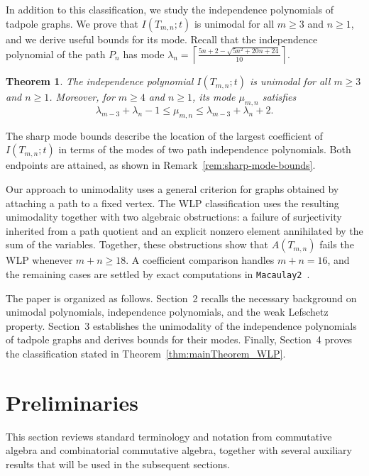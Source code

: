 \documentclass[12pt,twoside]{amsart}
\newtheorem{theorem}[thm]{Theorem}
\theoremstyle{definition}
\theoremstyle{mystyle}
\begin{document}
In addition to this classification, we study the independence polynomials 
of tadpole graphs. We prove that $I(T_{m,n};t)$ is unimodal for all 
$m\geq 3$ and $n\geq 1$, and we derive useful bounds for its mode. 
Recall that the independence polynomial of the path $P_n$ has mode
$\lambda_n=\left\lceil
\frac{5n+2-\sqrt{5n^2+20n+24}}{10}
\right\rceil$.
\begin{theorem}
The independence polynomial $I(T_{m,n};t)$ is unimodal for all $m\geq 3$ 
and $n\geq 1$. Moreover, for $m\geq 4$ and $n\geq 1$, its mode 
$\mu_{m,n}$ satisfies
\begin{equation*}
\lambda_{m-3}+\lambda_n-1
\leq \mu_{m,n}
\leq \lambda_{m-3}+\lambda_n+2.
\end{equation*}
\end{theorem}

The sharp mode bounds describe the location of the largest
coefficient of $I(T_{m,n};t)$ in terms of the modes of two
path independence polynomials. Both endpoints are attained,
as shown in Remark~\ref{rem:sharp-mode-bounds}.

Our approach to unimodality uses a general criterion for
graphs obtained by attaching a path to a fixed vertex.
The WLP classification uses the resulting unimodality
together with two algebraic obstructions: a failure of
surjectivity inherited from a path quotient and an explicit
nonzero element annihilated by the sum of the variables.
Together, these obstructions show that $A(T_{m,n})$ fails
the WLP whenever $m+n\geq18$. A coefficient comparison
handles $m+n=16$, and the remaining cases are settled by
exact computations in \texttt{Macaulay2}~\cite{HPS26M2}.



The paper is organized as follows. Section~2 recalls the necessary 
background on unimodal polynomials, independence polynomials, and the weak 
Lefschetz property. Section~3 establishes the unimodality of the independence 
polynomials of tadpole graphs and derives bounds for their modes. Finally, 
Section~4 proves the classification stated in Theorem~\ref{thm:mainTheorem_WLP}.

\section{Preliminaries}

This section reviews standard terminology and notation from commutative algebra and combinatorial commutative algebra, together with several auxiliary results that will be used in the subsequent sections.
\end{document}
